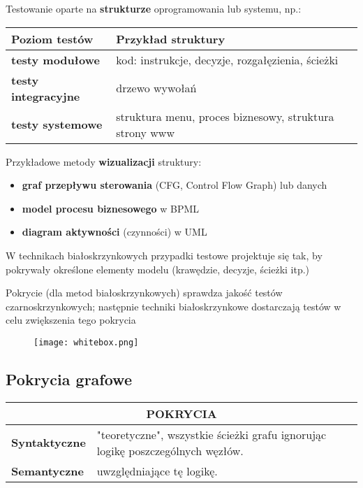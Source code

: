 \documentclass[../main.tex]{subfiles}
\begin{document}
    Testowanie oparte na \textbf{strukturze} oprogramowania lub systemu, np.:

    \begin{tabular}{p{4cm} || p{12cm}}
        \textbf{Poziom testów} & \textbf{Przykład struktury}\\
        \hline
        \hline
        \textbf{testy modułowe} & kod: instrukcje, decyzje, rozgałęzienia, ścieżki\\
        \hline
        \textbf{testy integracyjne} & drzewo wywołań\\
        \hline
        \textbf{testy systemowe} & struktura menu, proces biznesowy, struktura strony www\\
    \end{tabular}


    Przykładowe metody \textbf{wizualizacji} struktury:
    \begin{itemize}
        \item \textbf{graf przepływu sterowania} (CFG, Control Flow Graph) lub danych
        \item \textbf{model procesu biznesowego} w BPML
        \item \textbf{diagram aktywności} (czynności) w UML
    \end{itemize}
    W technikach białoskrzynkowych przypadki testowe projektuje się tak, by
    pokrywały określone elementy modelu (krawędzie, decyzje, ścieżki itp.)

    Pokrycie (dla metod białoskrzynkowych) sprawdza jakość testów czarnoskrzynkowych; następnie techniki
    białoskrzynkowe dostarczają testów w celu zwiększenia tego pokrycia

    \begin{figure}[H]
        \texttt{[image: whitebox.png]}
    \end{figure}


    \subsection{Pokrycia grafowe}

    \begin{table}[H]
        \begin{center}
            \begin{tabular}{p{8cm} | p{8cm}}
                \multicolumn{2}{c}{\textbf{POKRYCIA}}\\
                \hline
                \textbf{Syntaktyczne} & "teoretyczne", wszystkie ścieżki grafu ignorując logikę poszczególnych węzłów.\\
                \hline
                \textbf{Semantyczne} & uwzględniające tę logikę.\\

            \end{tabular}
        \end{center}
    \end{table}
\end{document}
